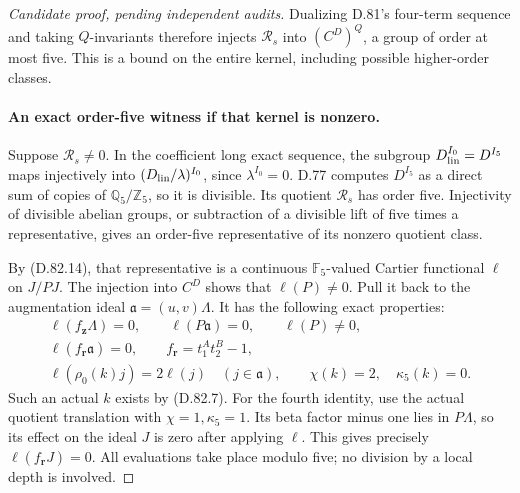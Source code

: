 \begin{proof}[Candidate proof, pending independent audits]
Dualizing D.81's four-term sequence and taking \(Q\)-invariants
therefore injects \(\mathcal R_s\) into
\((C^D)^Q\), a group of order at most five.
This is a bound on the entire kernel, including possible
higher-order classes.

\paragraph{An exact order-five witness if that kernel is nonzero.}
Suppose \(\mathcal R_s\ne0\). In the coefficient long exact
sequence, the subgroup \(D_{\rm lin}^{I_0}=D^{I_5}\) maps
injectively into \((D_{\rm lin}/\lambda)^{I_0}\), since
\(\lambda^{I_0}=0\). D.77 computes \(D^{I_5}\) as a direct
sum of copies of \(\mathbb Q_5/\mathbb Z_5\), so it is
divisible. Its quotient \(\mathcal R_s\) has order five.
Injectivity of divisible abelian groups, or subtraction
of a divisible lift of five times a representative, gives
an order-five representative of its nonzero quotient class.

By (D.82.14), that representative is a continuous
\(\mathbb F_5\)-valued Cartier functional \(\ell\) on \(J/PJ\).
The injection into \(C^D\) shows that \(\ell(P)\ne0\).
Pull it back to the augmentation ideal
\(\mathfrak a=(u,v)\Lambda\). It has the following exact properties:
\[
 \begin{gathered}
 \ell(f_{\mathbf z}\Lambda)=0,\qquad
 \ell(P\mathfrak a)=0,\qquad \ell(P)\ne0,\\
 \ell(f_{\mathbf r}\mathfrak a)=0,\qquad
 f_{\mathbf r}=t_1^A t_2^B-1,\\
 \ell(\rho_0(k)j)=2\ell(j)\quad(j\in\mathfrak a),
       \qquad \chi(k)=2,\quad\kappa_5(k)=0.
 \end{gathered}                                               \tag{D.82.16}
\]
Such an actual \(k\) exists by (D.82.7).
For the fourth identity, use the actual quotient translation
with \(\chi=1,\kappa_5=1\). Its beta factor minus one lies
in \(P\Lambda\), so its effect on the ideal \(J\) is zero
after applying \(\ell\). This gives precisely
\(\ell(f_{\mathbf r}J)=0\).
All evaluations take place modulo five; no division by
a local depth is involved.


\end{proof}
